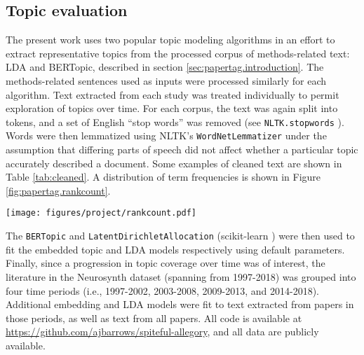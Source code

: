 \subsection{Topic evaluation}

The present work uses two popular topic modeling algorithms in an effort to extract representative topics from the processed corpus of methods-related text: LDA and BERTopic, described in section \ref{sec:papertag.introduction}. The methods-related sentences used as inputs were processed similarly for each algorithm. Text extracted from each study was treated individually to permit exploration of topics over time. For each corpus, the text was again split into tokens, and a set of English ``stop words'' was removed (see \texttt{NLTK.stopwords} \cite{BirdEtAl2009}). Words were then lemmatized using NLTK's \texttt{WordNetLemmatizer} under the assumption that differing parts of speech did not affect whether a particular topic accurately described a document. Some examples of cleaned text are shown in Table \ref{tab:cleaned}. A distribution of term frequencies is shown in Figure \ref{fig:papertag.rankcount}.


\begin{figure*}[]
	\centering	
	\texttt{[image: figures/project/rankcount.pdf]}  
	\caption{Rank-count distribution for methods-related corpus extracted using the list of words shown in Figure \ref{fig:papertag.corpus}. The 10 most commonly-used terms, the least common term, and a random selection of ``middle'' terms are labeled. Parts of speech were assigned for purposes of dataset exploration using NLTK's \texttt{pos\_tag} function \cite{BirdEtAl2009}.}
	\label{fig:papertag.rankcount}
\end{figure*}



The \texttt{BERTopic} and \texttt{LatentDirichletAllocation} (scikit-learn \cite{PedregosaEtAl2011}) were then used to fit the embedded topic and LDA models respectively using default parameters. Finally, since a progression in topic coverage over time was of interest, the literature in the Neurosynth dataset (spanning from 1997-2018) was grouped into four time periods (i.e., 1997-2002, 2003-2008, 2009-2013, and 2014-2018). Additional embedding and LDA models were fit to text extracted from papers in those periods, as well as text from all papers. All code is available at \href{https://github.com/ajbarrows/spiteful-allegory}{https://github.com/ajbarrows/spiteful-allegory}, and all data are publicly available.



%

